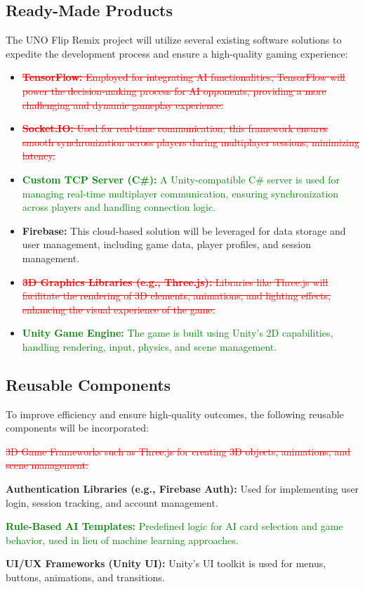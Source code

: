 \documentclass[12pt]{article}
\newcommand{\removed}[1]{\textcolor{red}{\sout{#1}}}
\newcommand{\added}[1]{\textcolor{green}{#1}}
\begin{document}
\subsection{Ready-Made Products}
The UNO Flip Remix project will utilize several existing software solutions to expedite the development process and ensure a high-quality gaming experience:
\begin{itemize}
    \item \removed{\textbf{TensorFlow:} Employed for integrating AI functionalities, TensorFlow will power the decision-making process for AI opponents, providing a more challenging and dynamic gameplay experience.}
    \item \removed{\textbf{Socket.IO:} Used for real-time communication, this framework ensures smooth synchronization across players during multiplayer sessions, minimizing latency.}
    \item \added{\textbf{Custom TCP Server (C\#):} A Unity-compatible C\# server is used for managing real-time multiplayer communication, ensuring synchronization across players and handling connection logic.}
    \item \textbf{Firebase:} This cloud-based solution will be leveraged for data storage and user management, including game data, player profiles, and session management.
    \item \removed{\textbf{3D Graphics Libraries (e.g., Three.js):} Libraries like Three.js will facilitate the rendering of 3D elements, animations, and lighting effects, enhancing the visual experience of the game.}
    \item \added{\textbf{Unity Game Engine:} The game is built using Unity’s 2D capabilities, handling rendering, input, physics, and scene management.}
\end{itemize}

\subsection{Reusable Components}
To improve efficiency and ensure high-quality outcomes, the following reusable components will be incorporated:
\begin{itemize}
    \item \removed{ 3D Game Frameworks such as Three.js for creating 3D objects, animations, and scene management.}
    \item \textbf{Authentication Libraries (e.g., Firebase Auth):} Used for implementing user login, session tracking, and account management.
    \added{\item \textbf{Rule-Based AI Templates:} Predefined logic for AI card selection and game behavior, used in lieu of machine learning approaches.}
    \item \textbf{UI/UX Frameworks (Unity UI):} Unity’s UI toolkit is used for menus, buttons, animations, and transitions.
\end{itemize}
\end{document}
